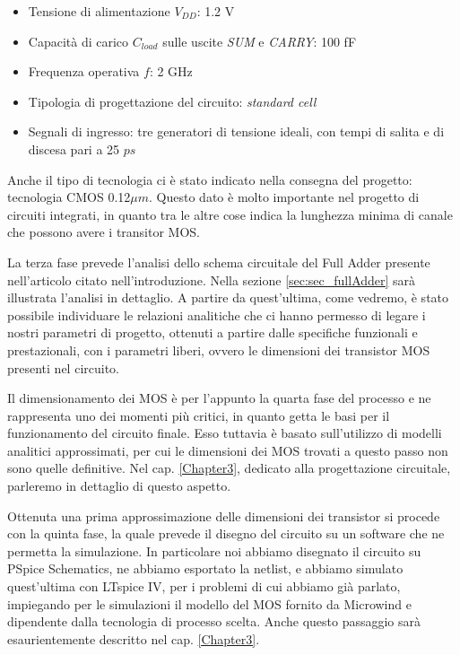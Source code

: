 \begin{itemize}
	\item Tensione di alimentazione $V _{DD}$: 1.2 V
	\item Capacità di carico $C _{load}$ sulle uscite \textit{SUM} e \textit{CARRY}: 100 fF
	\item Frequenza operativa $f$: 2 GHz
	\item Tipologia di progettazione del circuito: \textit{standard cell}
	\item Segnali di ingresso: tre generatori di tensione ideali, con tempi di salita e di discesa pari a 25 $ps$
\end{itemize}

Anche il tipo di tecnologia ci è stato indicato nella consegna del progetto: tecnologia CMOS 0.12$\mu m$. Questo dato è molto importante nel progetto di circuiti integrati, in quanto tra le altre cose indica la lunghezza minima di canale che possono avere i transitor MOS.

La terza fase prevede l'analisi dello schema circuitale del Full Adder presente nell'articolo citato nell'introduzione. Nella sezione \ref{sec:sec_fullAdder} sarà illustrata l'analisi in dettaglio. A partire da quest'ultima, come vedremo, è stato possibile individuare le relazioni analitiche che ci hanno permesso di legare i nostri parametri di progetto, ottenuti a partire dalle specifiche funzionali e prestazionali, con i parametri liberi, ovvero le dimensioni dei transistor MOS presenti nel circuito. 

Il dimensionamento dei MOS è per l'appunto la quarta fase del processo e ne rappresenta uno dei momenti più critici, in quanto getta le basi per il funzionamento del circuito finale. Esso tuttavia è basato sull'utilizzo di modelli analitici approssimati, per cui le dimensioni dei MOS trovati a questo passo non sono quelle definitive. Nel cap. \ref{Chapter3}, dedicato alla progettazione circuitale, parleremo in dettaglio di questo aspetto.

Ottenuta una prima approssimazione delle dimensioni dei transistor si procede con la quinta fase, la quale prevede il disegno del circuito su un software che ne permetta la simulazione. In particolare noi abbiamo disegnato il circuito su PSpice Schematics, ne abbiamo esportato la netlist, e abbiamo simulato quest'ultima con LTspice IV, per i problemi di cui abbiamo già parlato, impiegando per le simulazioni il modello del MOS fornito da Microwind e dipendente dalla tecnologia di processo scelta. Anche questo passaggio sarà esaurientemente descritto nel cap. \ref{Chapter3}.

